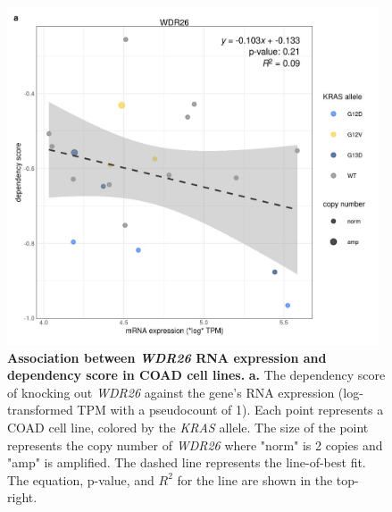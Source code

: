 \documentclass[english, 10pt, letterpaper]{article}
\newcommand{\KRAS}{\emph{KRAS}}
\begin{document}
\begin{figure}[p]
\centering
\includegraphics[height=100mm]{figures/SuppFigure_15.jpeg}
\caption{
    \textbf{Association between \emph{WDR26} RNA expression and dependency score in COAD cell lines.}
    \textbf{a.} The dependency score of knocking out \emph{WDR26} against the gene's RNA expression (log-transformed TPM with a pseudocount of 1). Each point represents a COAD cell line, colored by the \KRAS{} allele. The size of the point represents the copy number of \emph{WDR26} where "norm" is 2 copies and "amp" is amplified. The dashed line represents the line-of-best fit. The equation, p-value, and $R^2$ for the line are shown in the top-right.
}
\label{sfig:coad-dep-wdr26}
\end{figure}
\end{document}
